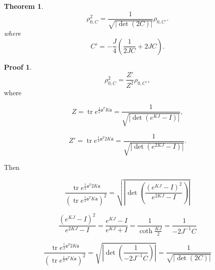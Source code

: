 \documentclass[12pt]{article}
\newtheorem{theorem}{Theorem}
\theoremstyle{definition}
\newtheorem*{demo}{Proof}
\begin{document}
	\begin{theorem}
			\begin{equation*}
			\label{eq:RhoSq}
			\rho_{0,C}^2 = \frac{1}{\sqrt{|\det(2 C)|}} \rho_{0,C'}.
		\end{equation*}
		where 
		\begin{equation*}
			C' = - \frac{J}{4}\left(\frac{1}{2 J C} + 2 J C\right).
		\end{equation*}
	\end{theorem}
	\begin{demo}
		\begin{equation*}
			\rho_{0,C}^2 = \frac{Z'}{Z^2}\rho_{0,C'},
		\end{equation*}
		where 
		
		\begin{equation*}
			Z = \operatorname{tr} e^{\frac12 \mathfrak{a}^T K  \mathfrak{a}}  = \frac{1}{\sqrt{|\det(e^{KJ} - I)|}},
		\end{equation*}
		
		\begin{equation*}
			Z' = \operatorname{tr} e^{\frac12 \mathfrak{a}^T 2K  \mathfrak{a}}  = \frac{1}{\sqrt{|\det(e^{2KJ} - I)|}}.
		\end{equation*}
		
		Then 
		
		\begin{equation*}
			\frac{\operatorname{tr} e^{\frac12 \mathfrak{a}^T 2K  \mathfrak{a}}  }{(\operatorname{tr} e^{\frac12 \mathfrak{a}^T K  \mathfrak{a}})^2} = \sqrt{\left|\det\left(\frac{(e^{KJ} - I)^2}{e^{2 KJ} - I}\right)\right|}
		\end{equation*}
		
		\begin{equation*}
			\frac{(e^{KJ} - I)^2}{e^{2 KJ} - I} = \frac{e^{KJ} - I}{e^{KJ} + I} = \frac{1}{\coth \frac{KJ}{2}} = \frac{1}{-2J^{-1} C}
		\end{equation*}
		
		\begin{equation*}
			\frac{\operatorname{tr} e^{\frac12 \mathfrak{a}^T 2K  \mathfrak{a}}  }{(\operatorname{tr} e^{\frac12 \mathfrak{a}^T K  \mathfrak{a}})^2} = \sqrt{\left|\det\left(\frac{1}{-2J^{-1} C}\right)\right|} = \frac{1}{\sqrt{|\det(2 C)|}}
		\end{equation*}
	\end{demo}
\end{document}
